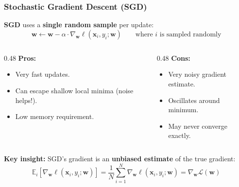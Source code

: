 \documentclass[notes,11pt, aspectratio=169]{beamer}
\newcommand{\vx}{\mathbf{x}}
\newcommand{\vw}{\mathbf{w}}
\newcommand{\E}{\mathbb{E}}
\begin{document}
\begin{frame}
\frametitle{Stochastic Gradient Descent (SGD)}

\textbf{SGD} uses a \textbf{single random sample} per update:
\[
    \vw \leftarrow \vw - \alpha \cdot \nabla_{\vw}\ell(\vx_i, y_i; \vw) \qquad \text{where $i$ is sampled randomly}
\]

\vspace{6pt}
\begin{columns}[T]
\begin{column}{0.48\textwidth}
\textbf{Pros:}
\begin{itemize}
    \item Very fast updates.
    \item Can escape shallow local minima (noise helps!).
    \item Low memory requirement.
\end{itemize}
\end{column}

\begin{column}{0.48\textwidth}
\textbf{Cons:}
\begin{itemize}
    \item Very noisy gradient estimate.
    \item Oscillates around minimum.
    \item May never converge exactly.
\end{itemize}
\end{column}
\end{columns}

\vspace{8pt}
\textbf{Key insight:} SGD's gradient is an \textbf{unbiased estimate} of the true gradient:
\[
    \E_i\left[\nabla_{\vw}\ell(\vx_i, y_i; \vw)\right] = \frac{1}{N}\sum_{i=1}^{N}\nabla_{\vw}\ell(\vx_i, y_i; \vw) = \nabla_{\vw}\mathcal{L}(\vw)
\]
\end{frame}
\end{document}
